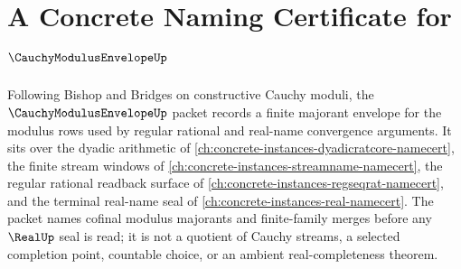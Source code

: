 \chapter{A Concrete Naming Certificate for $\CauchyModulusEnvelopeUp$}
\label{ch:concrete-instances-cauchy-modulus-envelope-namecert}

Following Bishop and Bridges on constructive Cauchy moduli, the $\CauchyModulusEnvelopeUp$ packet records a finite majorant envelope for the modulus rows used by regular rational and real-name convergence arguments. It sits over the dyadic arithmetic of \autoref{ch:concrete-instances-dyadicratcore-namecert}, the finite stream windows of \autoref{ch:concrete-instances-streamname-namecert}, the regular rational readback surface of \autoref{ch:concrete-instances-regseqrat-namecert}, and the terminal real-name seal of \autoref{ch:concrete-instances-real-namecert}. The packet names cofinal modulus majorants and finite-family merges before any $\RealUp$ seal is read; it is not a quotient of Cauchy streams, a selected completion point, countable choice, or an ambient real-completeness theorem.

